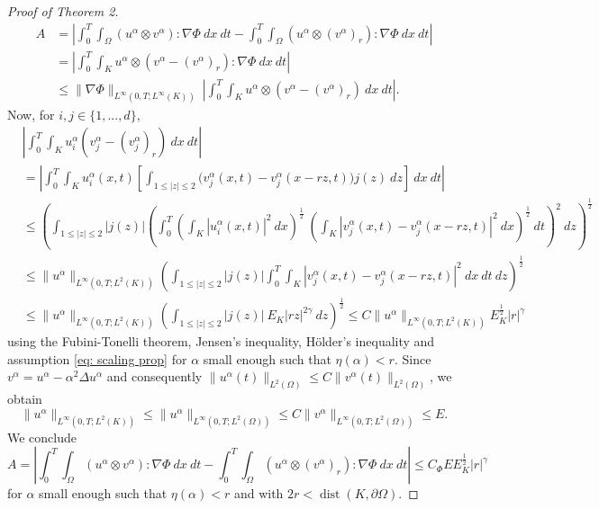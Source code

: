 \documentclass{amsart}
\begin{document}
\begin{proof}[Proof of Theorem 2]
\begin{equation*}
\begin{aligned}
 A&= \left| \int_0^T \int_{\Omega} (u^{\alpha} \otimes v^{\alpha}) : \nabla \Phi \ dx \ dt - \int_0^T \int_{\Omega} \left(u^{\alpha} \otimes (v^{\alpha})_r\right) : \nabla \Phi \ dx \ dt \right| \\
& = \left| \int_0^T \int_{K} u^{\alpha} \otimes \left(v^{\alpha}-(v^{\alpha})_r\right) : \nabla \Phi \ dx \ dt \right| \\
&\leq \|\nabla \Phi \|_{L^{\infty}(0,T;L^{\infty}(K))} \ \left| \int_0^T \int_{K} u^{\alpha}\otimes \left(v^{\alpha}-(v^{\alpha})_r\right) \ dx \ dt \right|.
\end{aligned}
\end{equation*}
Now, for $i,j \in \{1, ...,d\}$,
\begin{equation*}
\begin{aligned}
& \left| \int_0^T \int_{K} u^{\alpha}_i  (v^{\alpha}_j-(v^{\alpha}_j)_{r}) \ dx \ dt \right|\\
& = \left| \int_0^T \int_{K} u^{\alpha}_i(x,t)  \left[ \int_{1\leq |z|\leq 2} \Big( v^{\alpha}_j(x,t)-v^{\alpha}_j (x-rz,t)\Big) j(z) \ dz  \right] \ dx \ dt \right| \\
& \leq \left( \int_{1\leq |z|\leq 2} |j(z)| \left(\int_0^T \left(\int_{K} |u^{\alpha}_i(x,t)|^2  \ dx\right)^{\frac{1}{2}}  \   \left(\int_{K} |v^{\alpha}_j(x,t)-v^{\alpha}_j (x-rz,t)|^2 \ dx\right)^{\frac{1}{2}}  \ dt \right)^2 \ dz \right)^{\frac{1}{2}}\\
& \leq \| u^{\alpha} \|_{L^{\infty}(0,T;L^2(K))}  \left( \int_{1\leq |z|\leq 2} |j(z)| \int_0^T   \int_{K} |v^{\alpha}_j(x,t)-v^{\alpha}_j (x-rz,t)|^2 \ dx  \ dt  \ dz \right)^{\frac{1}{2}}\\
& \leq \| u^{\alpha} \|_{L^{\infty}(0,T;L^2(K))}  \left( \int_{1\leq |z|\leq 2} |j(z)| \ E_K |rz|^{2\gamma}  \ dz \right)^{\frac{1}{2}} \leq C \| u^{\alpha} \|_{L^{\infty}(0,T;L^2(K))}   E_K^{\frac{1}{2}}  |r|^{\gamma}  
\end{aligned}
\end{equation*}
using the Fubini-Tonelli theorem, Jensen's inequality, Hölder's inequality and assumption \eqref{eq: scaling prop} for $\alpha$ small enough such that $\eta(\alpha) < r$. Since $v^{\alpha}=u^{\alpha}-\alpha^2 \Delta u^{\alpha}$ and consequently $\|u^{\alpha}(t)\|_{L^2(\Omega)} \leq C  \|v^{\alpha}(t)\|_{L^2(\Omega)}$, we obtain
$$ \| u^{\alpha} \|_{L^{\infty}(0,T;L^2(K))} \leq \| u^{\alpha} \|_{L^{\infty}(0,T;L^2(\Omega))} \leq C\|v^{\alpha} \|_{L^{\infty}(0,T;L^2(\Omega))} \leq E.$$
We conclude
$$ A = \left| \int_0^T \int_{\Omega} (u^{\alpha} \otimes v^{\alpha}) : \nabla \Phi \ dx \ dt - \int_0^T \int_{\Omega} \left(u^{\alpha} \otimes (v^{\alpha})_r\right) : \nabla \Phi \ dx \ dt \right| \leq C_{\Phi}   E  E_K^{\frac{1}{2}} |r|^{\gamma}$$
for $\alpha$ small enough such that $\eta(\alpha) < r$ and with $2r<\operatorname{dist}(K,\partial\Omega)$.


\end{proof}
\end{document}
